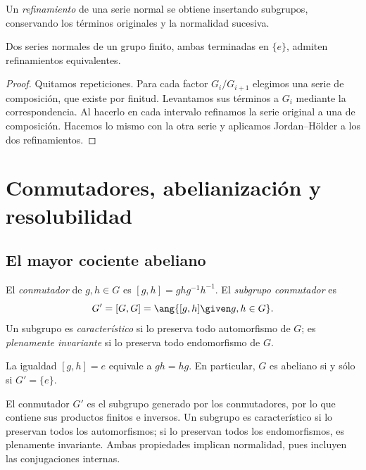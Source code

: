 \begin{defi}
Un \emph{refinamiento} de una serie normal se obtiene insertando subgrupos, conservando los términos originales y la normalidad sucesiva.
\end{defi}
\begin{prop}
Dos series normales de un grupo finito, ambas terminadas en $\{e\}$, admiten refinamientos equivalentes.
\end{prop}
\begin{proof}
Quitamos repeticiones. Para cada factor $G_i/G_{i+1}$ elegimos una serie de composición, que existe por finitud. Levantamos sus términos a $G_i$ mediante la correspondencia. Al hacerlo en cada intervalo refinamos la serie original a una de composición. Hacemos lo mismo con la otra serie y aplicamos Jordan--Hölder a los dos refinamientos.
\end{proof}

\section{Conmutadores, abelianización y resolubilidad}
\subsection{El mayor cociente abeliano}
\begin{defi}
El \emph{conmutador} de $g,h\in G$ es $[g,h]=ghg^{-1}h^{-1}$. El \emph{subgrupo conmutador} es
\[
G'=[G,G]=\ang{[g,h]\given g,h\in G}.
\]
Un subgrupo es \emph{característico} si lo preserva todo automorfismo de $G$; es \emph{plenamente invariante} si lo preserva todo endomorfismo de $G$.
\end{defi}
La igualdad $[g,h]=e$ equivale a $gh=hg$. En particular, $G$ es abeliano si y sólo si $G'=\{e\}$.
\begin{obs}
El conmutador $G'$ es el subgrupo generado por los conmutadores, por lo que contiene sus productos finitos e inversos. Un subgrupo es característico si lo preservan todos los automorfismos; si lo preservan todos los endomorfismos, es plenamente invariante. Ambas propiedades implican normalidad, pues incluyen las conjugaciones internas.
\end{obs}

